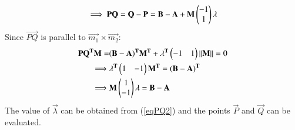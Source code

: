 \documentclass[journal,12pt,twocolumn]{IEEEtran}
\begin{document}
\begin{align}
	\implies \vec{PQ} = \vec{Q}-\vec{P} = \vec{B}-\vec{A} 
			   + \vec{M}\myvec{-1\\1}\vec{\lambda}  \label{eqPQ1}
\end{align}
Since $\vec{PQ}$ is parallel to $\vec{m_1} \times \vec{m_2}$:
\begin{align}
	\vec{PQ^T}\vec{M} =& \vec{(B-A)^T}\vec{M^T} 
	    +\vec{\lambda^T}\myvec{-1  & 1}\norm{\vec{M}}=0 \label{eqPQ2} \\
	\implies & \vec{\lambda^T}\myvec{1 & -1}\vec{M^T} = \vec{(B-A)^T} \\
	\implies & \vec{M}\myvec{1 \\ -1}\vec{\lambda} = \vec{B-A}
\end{align}
The value of $\vec{\lambda}$ can be obtained from (\ref{eqPQ2}) and the points 
	$\vec{P}$ and $\vec{Q}$ can be evaluated. 
\end{document}
